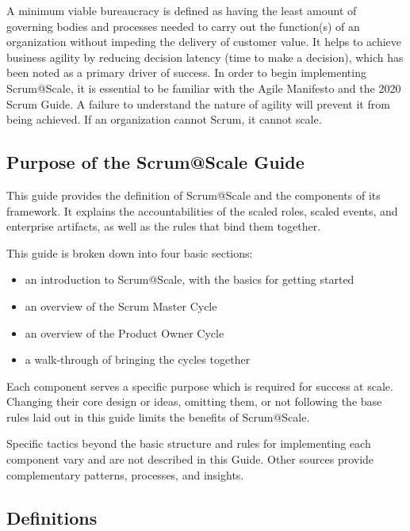 \documentclass[12pt,a4paper,parskip=full]{scrartcl}
\begin{document}
A minimum viable bureaucracy is defined as having the least amount of governing bodies and processes needed to carry out the function(s) of an organization without impeding the delivery of customer value. It helps to achieve business agility by reducing decision latency (time to make a decision), which has been noted as a primary driver of success. In order to begin implementing Scrum@Scale, it is essential to be familiar with the Agile Manifesto and the 2020 Scrum Guide. A failure to understand the nature of agility will prevent it from being achieved. If an organization cannot Scrum, it cannot scale.


\subsection{Purpose of the Scrum@Scale
Guide}\label{purpose-of-the-ScrumatScale-guide}

This guide provides the definition of Scrum@Scale and the components of its framework. It explains the accountabilities of the scaled roles, scaled events, and enterprise artifacts, as well as the rules that bind them together.

This guide is broken down into four basic sections:

\begin{itemize}
\itemsep1pt\parskip0pt
\item
  an introduction to Scrum@Scale, with the basics for getting started
\item
  an overview of the Scrum Master Cycle
\item
  an overview of the Product Owner Cycle
\item
  a walk-through of bringing the cycles together
\end{itemize}

Each component serves a specific purpose which is required for success at scale. Changing their core design or ideas, omitting them, or not following the base rules laid out in this guide limits the benefits of Scrum@Scale.

Specific tactics beyond the basic structure and rules for implementing each component vary and are not described in this Guide. Other sources provide complementary patterns, processes, and insights.

\subsection{Definitions}\label{definitions}
\end{document}
